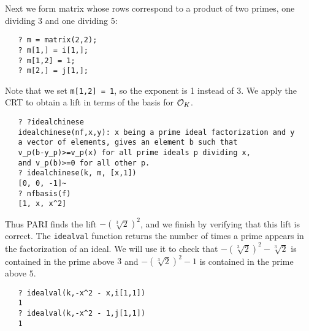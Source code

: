 Next we form matrix whose rows correspond to a product of two primes,
one dividing $3$ and one dividing $5$:
\begin{verbatim}
   ? m = matrix(2,2);       
   ? m[1,] = i[1,];  
   ? m[1,2] = 1;
   ? m[2,] = j[1,];
\end{verbatim}
Note that we set {\tt m[1,2] = 1}, so the exponent is 1
instead of $3$.
We apply the CRT to obtain a lift in terms
of the basis for $\mathcal{O}_K$. 
\begin{verbatim}
   ? ?idealchinese
   idealchinese(nf,x,y): x being a prime ideal factorization and y 
   a vector of elements, gives an element b such that 
   v_p(b-y_p)>=v_p(x) for all prime ideals p dividing x, 
   and v_p(b)>=0 for all other p.
   ? idealchinese(k, m, [x,1])
   [0, 0, -1]~
   ? nfbasis(f)
   [1, x, x^2]
\end{verbatim}
Thus PARI finds the lift $-(\sqrt[3]{2})^2$, and we finish by
verifying that this lift is correct. The
{\tt idealval} function returns the number of times
a prime appears in the factorization of an ideal. We will use it
to check that $-(\sqrt[3]{2})^2 - \sqrt[3]{2}$ is contained in
the prime above $3$ and $-(\sqrt[3]{2})^2 - 1$ is contained in
the prime above $5$.
\begin{verbatim}
   ? idealval(k,-x^2 - x,i[1,1])
   1
   ? idealval(k,-x^2 - 1,j[1,1])
   1
\end{verbatim}



